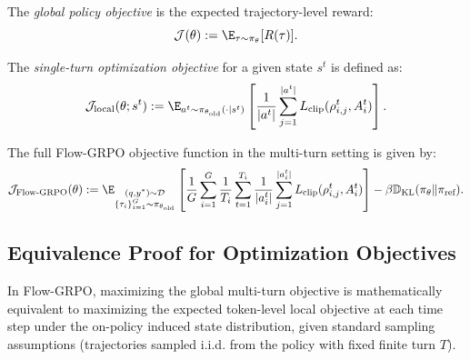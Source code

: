 \begin{definition}
The \emph{global policy objective} is the expected trajectory-level reward:
\begin{equation}
    \mathcal{J}(\theta) := \E_{\tau \sim \pi_{\theta}}[R(\tau)].
\end{equation}

The \emph{single-turn optimization objective} for a given state $s^t$ is defined as:
\begin{equation}
    \mathcal{J}_{\text{local}}(\theta; s^t) := \E_{a^t \sim \pi_{\theta_{\text{old}}}(\cdot \mid s^t)} \left[ \frac{1}{|a^t|} \sum_{j=1}^{|a^t|} L_{\text{clip}}(\rho_{i, j}^t, A_i^t) \right].
\end{equation}

The full \emph{}{Flow-GRPO objective function} in the multi-turn setting is given by:
\begin{equation}
    \mathcal{J}_{\text{Flow-GRPO}}(\theta) := \E_{\substack{(q,y^*) \sim \mathcal{D} \\ \{\tau_i\}_{i=1}^G \sim \pi_{\theta_{\text{old}}}}} \left[ \frac{1}{G} \sum_{i=1}^G \frac{1}{T_i} \sum_{t=1}^{T_i} \frac{1}{|a^t_i|} \sum_{j=1}^{|a^t_i|} L_{\text{clip}}(\rho_{i,j}^t, A_i^t) \right] - \beta \mathbb{D}_{\mathrm{KL}}(\pi_\theta \| \pi_{\text{ref}}).
\end{equation}
\end{definition}

\subsection{Equivalence Proof for Optimization Objectives}


\begin{theorem}    
In Flow-GRPO, maximizing the global multi-turn objective is mathematically equivalent to maximizing the expected token-level local objective at each time step under the on-policy induced state distribution, given standard sampling assumptions (trajectories sampled i.i.d. from the policy with fixed finite turn $T$).
\end{theorem}



